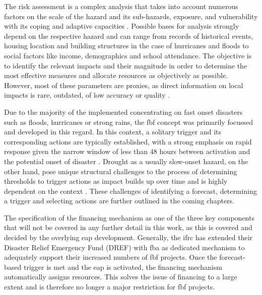 The risk assessment is a complex analysis that takes into account numerous factors on the scale of the hazard and its sub-hazards, exposure, and vulnerability with its coping and adaptive capacities \autocite{ifrcFbFPractitionersManual2023}. Possible bases for analysis strongly depend on the respective hazard and can range from records of historical events, housing location and building structures in the case of hurricanes and floods to social factors like income, demographics and school attendance. The objective is to identify the relevant impacts and their magnitude in order to determine the most effective measures and allocate resources as objectively as possible. However, most of these parameters are proxies, as direct information on local impacts is rare, outdated, of low accuracy or quality \autocite{ifrcFbFPractitionersManual2023}.

Due to the majority of the implemented  concentrating on fast onset disasters such as floods, hurricanes or strong rains, the \acrlong{fbf} concept was primarily focussed and developed in this regard. In this context, a solitary trigger and its corresponding actions are typically established, with a strong emphasis on rapid response given the narrow window of less than 48 hours between activation and the potential onset of disaster \autocite{rcrcFORECASTBASEDFINANCINGEARLY2020}. Drought as a usually slow-onset hazard, on the other hand, pose unique structural challenges to the process of determining thresholds to trigger actions as impact builds up over time and is highly dependent on the context \autocite{boultDroughtImpactbasedForecasting2022}. These challenges of identifying a forecast, determining a trigger and selecting actions are further outlined in the coming chapters.

The specification of the financing mechanism as one of the three key components that will not be covered in any further detail in this work, as this is covered and decided by the overlying \acrshort{eap} development. Generally, the \acrshort{ifrc} has extended their Disaster Relief Emergency Fund (DREF) with \acrfull{fba} as dedicated mechanism to adequately support their increased numbers of \acrshort{fbf} projects. Once the forecast-based trigger is met and the \acrshort{eap} is activated, the financing mechanism automatically assigns resources. This solves the issue of financing to a large extent and is therefore no longer a major restriction for \acrshort{fbf} projects.



